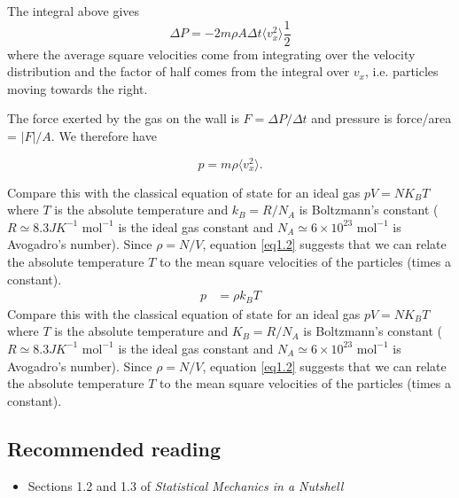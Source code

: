 The integral above gives 
$$\Delta P = -2m\rho A\Delta t \langle v_x^2\rangle\frac12$$ where the average square velocities come from integrating over the velocity distribution and the factor of half comes from the integral over $v_x$, i.e. particles moving towards the right.

The force exerted by the gas on the wall is $F=\Delta P/\Delta t$ and pressure is force/area = $|F|/A$.
We therefore have 

\begin{equation}
	p=m\rho  \langle v_x^2\rangle.
	\label{eq1.2}
\end{equation}
 
Compare this with the classical equation of state for an ideal gas $pV=NK_BT$ where $T$ is the absolute temperature and $k_B=R/N_A$ is Boltzmann's constant ($R\simeq8.3JK^{-1} \text{ mol}^{-1}$ is the ideal gas constant and $N_A\simeq6\times10^{23} \text{ mol}^{-1}$ is Avogadro's number). Since $\rho = N/V$, equation \ref{eq1.2} suggests that we can relate the absolute temperature $T$ to the mean square velocities of the particles (times a constant).
\begin{align*}
	p &= \rho k_{B}T
\end{align*}
Compare this with the classical equation of state for an ideal gas $pV=NK_BT$ where $T$ is the absolute temperature and $K_B=R/N_A$ is Boltzmann's constant ($R\simeq8.3JK^{-1} \text{ mol}^{-1}$ is the ideal gas constant and $N_A\simeq6\times10^{23} \text{ mol}^{-1}$ is Avogadro's number). Since $\rho = N/V$, equation \ref{eq1.2} suggests that we can relate the absolute temperature $T$ to the mean square velocities of the particles (times a constant).

\subsection{Recommended reading}
\begin{itemize}
	\item Sections 1.2 and 1.3 of \emph{Statistical Mechanics in a Nutshell}
\end{itemize}


